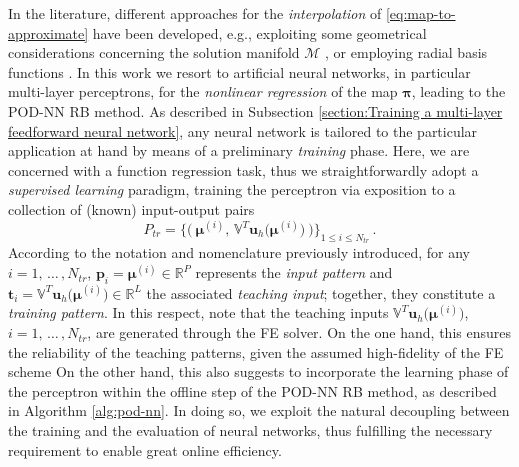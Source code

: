 \documentclass{elsarticle}
\numberwithin{equation}{section}
\theoremstyle{theorem}
\theoremstyle{definition}
\theoremstyle{remark}
\theoremstyle{proposition}
\numberwithin{figure}{section}
\newcommand{\bg}[1]{\boldsymbol{#1}}
\begin{document}
		In the literature, different approaches for the \emph{interpolation} of \eqref{eq:map-to-approximate} have been developed, e.g., exploiting some geometrical considerations concerning the solution manifold $\mathcal{M}$ \cite{Ams10}, or employing radial basis functions \cite{Chen17}. In this work we resort to artificial neural networks, in particular multi-layer perceptrons, for the \emph{nonlinear regression} of the map $\bg{\pi}$, leading to the POD-NN RB method. As described in Subsection \ref{section:Training a multi-layer feedforward neural network}, any neural network is tailored to the particular application at hand by means of a preliminary \emph{training} phase. Here, we are concerned with a function regression task, thus we straightforwardly adopt a \emph{supervised learning} paradigm, training the perceptron via exposition to a collection of (known) input-output pairs
		\begin{equation*}
			P_{tr} = \big\lbrace \big( ~ \bg{\mu}^{(i)}, \, \mathbb{V}^T \mathbf{u}_h \big( \bg{\mu}^{(i)} \big) ~ \big) \big\rbrace_{1 \leq i \leq N_{tr}} \, .
		\end{equation*} 
		According to the notation and nomenclature previously introduced, for any $i = 1, \, \ldots \, , N_{tr}$, $\mathbf{p}_i = \bg{\mu}^{(i)} \in \mathbb{R}^P$ represents the \emph{input pattern} and $\mathbf{t}_i =  \mathbb{V}^T \mathbf{u}_h \big( \bg{\mu}^{(i)} \big) \in \mathbb{R}^L$ the associated \emph{teaching input}; together, they constitute a \emph{training pattern}. In this respect, note that the teaching inputs $\mathbb{V}^T \mathbf{u}_h \big( \bg{\mu}^{(i)} \big)$, $i = 1, \, \ldots \, , N_{tr}$, are generated through the FE solver. On the one hand, this ensures the reliability of the teaching patterns, given the assumed high-fidelity of the FE scheme %
		On the other hand, this also suggests to incorporate the learning phase of the perceptron within the offline step of the POD-NN RB method, as described in Algorithm \ref{alg:pod-nn}. In doing so, we exploit the natural decoupling between the training and the evaluation of neural networks, thus fulfilling the necessary requirement to enable great online efficiency. %
						
		\algrenewcommand\textproc{}
		
\end{document}
